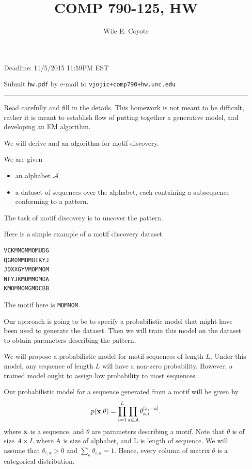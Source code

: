 \documentclass{article}
\begin{document}
\author{Wile E. Coyote}
\setcounter{HW}{2}
\title{COMP  790-125, HW\theHW}
\maketitle


{ Deadline: 11/5/2015 11:59PM EST}

{ Submit \texttt{hw\theHW.pdf} by e-mail to \texttt{vjojic+comp790+hw\theHW@cs.unc.edu}



\noindent\rule{\textwidth}{3pt}

Read carefully and fill in the details. This homework is not meant to be difficult, rather it is meant
to establish flow of putting together a generative model, and developing an EM algorithm.


We will derive and an algorithm for motif discovery. 

We are given
\begin{itemize}
\item an alphabet $\mathcal{A}$
\item a dataset of sequences over the alphabet, each containing a subsequence conforming to a pattern.
\end{itemize}
The task of motif discovery is to uncover the pattern.


Here is a simple example of a motif discovery dataset
\begin{verbatim}
VCKMMOMMOMUDG
QGMOMMOMBIKYJ
JDXXGYVMOMMOM
NFYJKMOMMOMOA
KMOMMOMGMDCBB
\end{verbatim}
The motif here is \verb|MOMMOM|.

\vskip 5pt

Our approach is going to be to specify a probabilistic model that might have been used
to generate the dataset. Then we will train this model on the dataset to obtain parameters
describing the pattern. 


\newproblem{2pt}
We will propose a probabilistic model for motif sequences of length $L$.
Under this model, any sequence of length $L$ will have a non-zero probability.
However, a trained model ought to assign low probability to most sequences.

Our probabilistic model for a sequence generated from a motif will be given by
\[
p(\mathbf{x}|\theta) = \prod_{i=1}^L\prod_{a \in \mathcal{A}} \theta_{a,i}^{[x_i = a]}.
\]
where $\mathbf{x}$ is a sequence, and $\theta$ are parameters describing a motif.
Note that $\theta$ is of size $A \times L$ where A is size of alphabet, and L is length of sequence.
We will assume that $\theta_{i,a} > 0$ and $\sum_a \theta_{i,a} = 1$. Hence, every column
of matrix $\theta$ is a categorical distribution.

}
\end{document}
